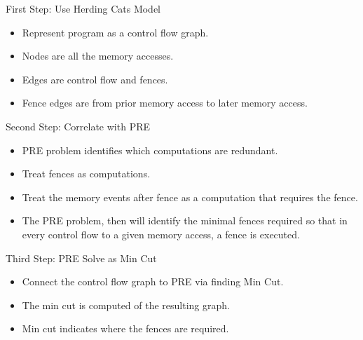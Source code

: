 \documentclass[notes, xcolor=dvipsnames]{beamer}
\begin{document}
    \begin{frame}{First Step: Use Herding Cats Model}
        
        \begin{itemize}
            \item Represent program as a control flow graph.
            \item Nodes are all the memory accesses.
            \item Edges are control flow and fences.
            \item Fence edges are from prior memory access to later memory access.  
        \end{itemize}

    \end{frame}

    \begin{frame}{Second Step: Correlate with PRE}

        \begin{itemize}
            \item PRE problem identifies which computations are redundant.
            \item Treat fences as computations. 
            \item Treat the memory events after fence as a computation that requires the fence. 
            \item The PRE problem, then will identify the minimal fences required so that in every control flow to a given memory access, a fence is executed.
        \end{itemize}
        
    \end{frame}

    \begin{frame}{Third Step: PRE Solve as Min Cut}
        
        \begin{itemize}
            \item Connect the control flow graph to PRE via finding Min Cut. 
        \end{itemize}

        \begin{figure}
        \end{figure}
        
        \begin{itemize}
            \item The min cut is computed of the resulting graph. 
            \item Min cut indicates where the fences are required.
        \end{itemize}

    \end{frame}
\end{document}
